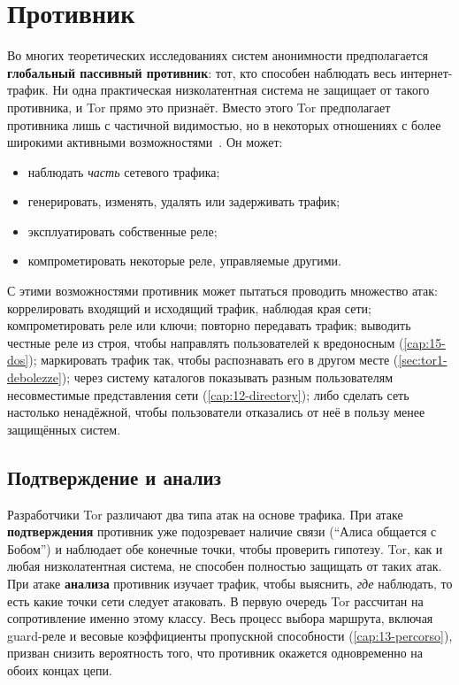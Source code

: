 \section{Противник}\label{sec:minaccia-avversario}

Во многих теоретических исследованиях систем анонимности предполагается \textbf{глобальный пассивный противник}: тот, кто способен наблюдать весь интернет-трафик. Ни одна практическая низколатентная система не защищает от такого противника, и Tor прямо это признаёт. Вместо этого Tor предполагает противника лишь с частичной видимостью, но в некоторых отношениях с более широкими активными возможностями~\cite{dingledine2004tor}. Он может:
\begin{itemize}
  \item наблюдать \emph{часть} сетевого трафика;
  \item генерировать, изменять, удалять или задерживать трафик;
  \item эксплуатировать собственные реле;
  \item компрометировать некоторые реле, управляемые другими.
\end{itemize}
С этими возможностями противник может пытаться проводить множество атак: коррелировать входящий и исходящий трафик, наблюдая края сети; компрометировать реле или ключи; повторно передавать трафик; выводить честные реле из строя, чтобы направлять пользователей к вредоносным (\cref{cap:15-dos}); маркировать трафик так, чтобы распознавать его в другом месте (\cref{sec:tor1-debolezze}); через систему каталогов показывать разным пользователям несовместимые представления сети (\cref{cap:12-directory}); либо сделать сеть настолько ненадёжной, чтобы пользователи отказались от неё в пользу менее защищённых систем.

\subsection{Подтверждение и анализ}

Разработчики Tor различают два типа атак на основе трафика. При атаке \textbf{подтверждения} противник уже подозревает наличие связи (\enquote{Алиса общается с Бобом}) и наблюдает обе конечные точки, чтобы проверить гипотезу. Tor, как и любая низколатентная система, не способен полностью защищать от таких атак. При атаке \textbf{анализа} противник изучает трафик, чтобы выяснить, \emph{где} наблюдать, то есть какие точки сети следует атаковать. В первую очередь Tor рассчитан на сопротивление именно этому классу. Весь процесс выбора маршрута, включая guard-реле и весовые коэффициенты пропускной способности (\cref{cap:13-percorso}), призван снизить вероятность того, что противник окажется одновременно на обоих концах цепи.

